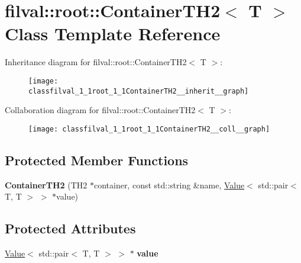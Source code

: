 \hypertarget{classfilval_1_1root_1_1ContainerTH2}{}\section{filval\+:\+:root\+:\+:Container\+T\+H2$<$ T $>$ Class Template Reference}
\label{classfilval_1_1root_1_1ContainerTH2}


Inheritance diagram for filval\+:\+:root\+:\+:Container\+T\+H2$<$ T $>$\+:
\nopagebreak
\begin{figure}[H]
\begin{center}
\leavevmode
\texttt{[image: classfilval\_1\_1root\_1\_1ContainerTH2\_\_inherit\_\_graph]}
\end{center}
\end{figure}


Collaboration diagram for filval\+:\+:root\+:\+:Container\+T\+H2$<$ T $>$\+:
\nopagebreak
\begin{figure}[H]
\begin{center}
\leavevmode
\texttt{[image: classfilval\_1\_1root\_1\_1ContainerTH2\_\_coll\_\_graph]}
\end{center}
\end{figure}
\subsection*{Protected Member Functions}
\begin{DoxyCompactItemize}
\item 
\hypertarget{classfilval_1_1root_1_1ContainerTH2_aa195d5dfeb0af525fe6c42723940342d}{}\label{classfilval_1_1root_1_1ContainerTH2_aa195d5dfeb0af525fe6c42723940342d} 
{\bfseries Container\+T\+H2} (T\+H2 $\ast$container, const std\+::string \&name, \hyperlink{classfilval_1_1Value}{Value}$<$ std\+::pair$<$ T, T $>$ $>$ $\ast$value)
\end{DoxyCompactItemize}
\subsection*{Protected Attributes}
\begin{DoxyCompactItemize}
\item 
\hypertarget{classfilval_1_1root_1_1ContainerTH2_aab6f93ef29df26ea60ef88c6b5d66499}{}\label{classfilval_1_1root_1_1ContainerTH2_aab6f93ef29df26ea60ef88c6b5d66499} 
\hyperlink{classfilval_1_1Value}{Value}$<$ std\+::pair$<$ T, T $>$ $>$ $\ast$ {\bfseries value}
\end{DoxyCompactItemize}
